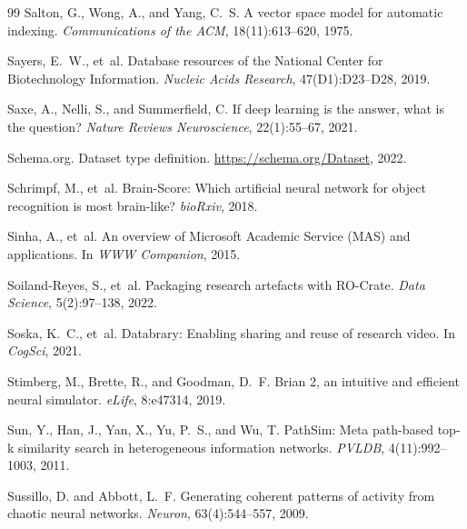 \documentclass{article}
\theoremstyle{definition}
\begin{document}
\begin{thebibliography}{99}
Salton, G., Wong, A., and Yang, C.~S.
\newblock A vector space model for automatic indexing.
\newblock \emph{Communications of the ACM}, 18(11):613--620, 1975.

Sayers, E.~W., et~al.
\newblock Database resources of the National Center for Biotechnology Information.
\newblock \emph{Nucleic Acids Research}, 47(D1):D23--D28, 2019.

Saxe, A., Nelli, S., and Summerfield, C.
\newblock If deep learning is the answer, what is the question?
\newblock \emph{Nature Reviews Neuroscience}, 22(1):55--67, 2021.

Schema.org.
\newblock Dataset type definition.
\newblock \url{https://schema.org/Dataset}, 2022.

Schrimpf, M., et~al.
\newblock Brain-Score: Which artificial neural network for object recognition is most brain-like?
\newblock \emph{bioRxiv}, 2018.

Sinha, A., et~al.
\newblock An overview of Microsoft Academic Service (MAS) and applications.
\newblock In \emph{WWW Companion}, 2015.

Soiland-Reyes, S., et~al.
\newblock Packaging research artefacts with RO-Crate.
\newblock \emph{Data Science}, 5(2):97--138, 2022.

Soska, K.~C., et~al.
\newblock Databrary: Enabling sharing and reuse of research video.
\newblock In \emph{CogSci}, 2021.

Stimberg, M., Brette, R., and Goodman, D.~F.
\newblock Brian 2, an intuitive and efficient neural simulator.
\newblock \emph{eLife}, 8:e47314, 2019.

Sun, Y., Han, J., Yan, X., Yu, P.~S., and Wu, T.
\newblock PathSim: Meta path-based top-k similarity search in heterogeneous information networks.
\newblock \emph{PVLDB}, 4(11):992--1003, 2011.

Sussillo, D. and Abbott, L.~F.
\newblock Generating coherent patterns of activity from chaotic neural networks.
\newblock \emph{Neuron}, 63(4):544--557, 2009.


\end{thebibliography}
\end{document}
